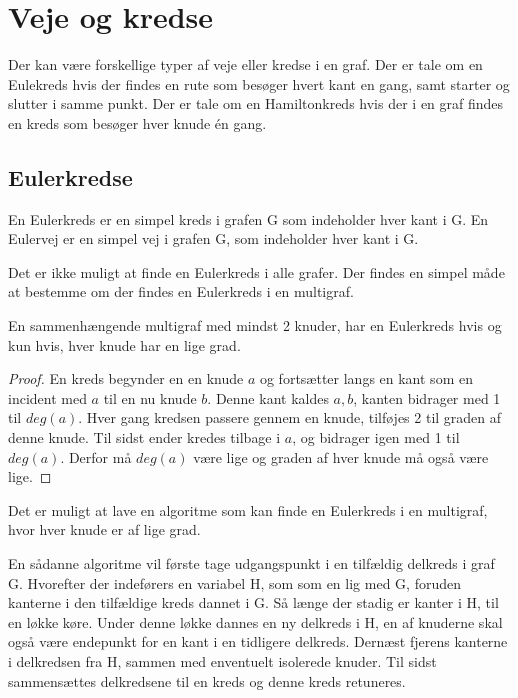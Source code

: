 \chapter{Veje og kredse}
Der kan være forskellige typer af veje eller kredse i en graf. Der er tale om en Eulekreds hvis der findes en rute som besøger hvert kant en gang, samt starter og slutter i samme punkt. Der er tale om en Hamiltonkreds hvis der i en graf findes en kreds som besøger hver knude én gang. 

\section{Eulerkredse}

\begin{defn}\label{euler_def}
En Eulerkreds er en simpel kreds i grafen G som indeholder hver kant i G.
En Eulervej er en simpel vej i grafen G, som indeholder hver kant i G.  
\end{defn}

\noindent Det er ikke muligt at finde en Eulerkreds i alle grafer. 
Der findes en simpel måde at bestemme om der findes en Eulerkreds i en multigraf. 

\begin{thm}\label{Euler_multigraf}
En sammenhængende multigraf med mindst 2 knuder, har en Eulerkreds hvis og kun hvis, hver knude har en lige grad.
\end{thm}

\begin{proof} 
En kreds begynder en en knude $a$ og fortsætter langs en kant som en incident med $a$ til en nu knude $b$. 
Denne kant kaldes ${a,b}$, kanten bidrager med 1 til $deg(a)$. 
Hver gang kredsen passere gennem en knude, tilføjes 2 til graden af denne knude. 
Til sidst ender kredes tilbage i $a$, og bidrager igen med 1 til $deg(a)$. 
Derfor må $deg(a)$ være lige og graden af hver knude må også være lige.  
\end{proof} 

Det er muligt at lave en algoritme som kan finde en Eulerkreds i en multigraf, hvor hver knude er af lige grad.

En sådanne algoritme vil første tage udgangspunkt i en tilfældig delkreds i graf G. 
Hvorefter der indeførers en variabel H, som som en lig med G, foruden kanterne i den tilfældige kreds dannet i G. 
Så længe der stadig er kanter i H, til en løkke køre. 
Under denne løkke dannes en ny delkreds i H, en af knuderne skal også være endepunkt for en kant i en tidligere delkreds.
Dernæst fjerens kanterne i delkredsen fra H, sammen med enventuelt isolerede knuder. 
Til sidst sammensættes delkredsene til en kreds og denne kreds retuneres.   

